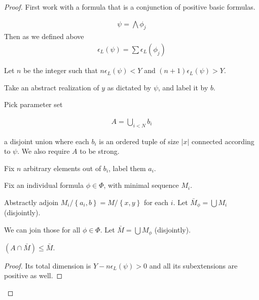 \documentclass{amsart}
\newcommand{\curly}[1]{\left\{#1\right\}}
\begin{document}




\begin{proof}
	First work with a formula that is a conjunction of positive basic formulas.

	\begin{align*}
		\psi = \bigwedge \phi_j
	\end{align*}
	Then as we defined above
	\begin{align*}
		\epsilon_L(\psi) = \sum \epsilon_L(\phi_j)
	\end{align*}

	Let $n$ be the integer such that $n \epsilon_L(\psi) < Y$ and $(n+1) \epsilon_L(\psi) > Y$.

	Take an abstract realization of $y$ as dictated by $\psi$, and label it by $b$.

	Pick parameter set 

	\begin{align*}
		A = \bigcup_{i<N} b_i
	\end{align*}

	a disjoint union where each $b_i$ is an ordered tuple of size $|x|$ connected according to $\psi$.
	We also require $A$ to be strong.

	Fix $n$ arbitrary elements out of $b_i$, label them $a_i$.

	Fix an individual formula $\phi \in \Phi$, with minimal sequence $M_i$.

	Abstractly adjoin $M_i/\curly{a_i, b} = M/\curly{x,y}$ for each $i$.
	Let $\bar M_\phi = \bigcup M_i$ (disjointly).

	We can join those for all $\phi \in \Phi$.
	Let $\bar M = \bigcup M_\phi$ (disjointly).

	\begin{Claim}
		$(A \cap \bar M) \leq \bar M$.
	\end{Claim}
	\begin{proof}
		Its total dimension is $Y - n\epsilon_L(\psi) > 0$ and all its subextensions are positive as well.
	\end{proof}


\end{proof}
\end{document}
